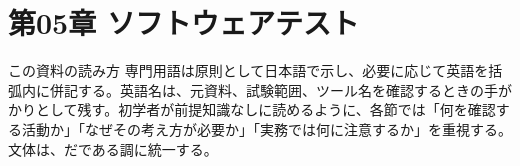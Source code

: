 \section{第05章 ソフトウェアテスト}
\begin{pointbox}{この資料の読み方}
専門用語は原則として日本語で示し、必要に応じて英語を括弧内に併記する。英語名は、元資料、試験範囲、ツール名を確認するときの手がかりとして残す。初学者が前提知識なしに読めるように、各節では「何を確認する活動か」「なぜその考え方が必要か」「実務では何に注意するか」を重視する。文体は、だである調に統一する。
\end{pointbox}
